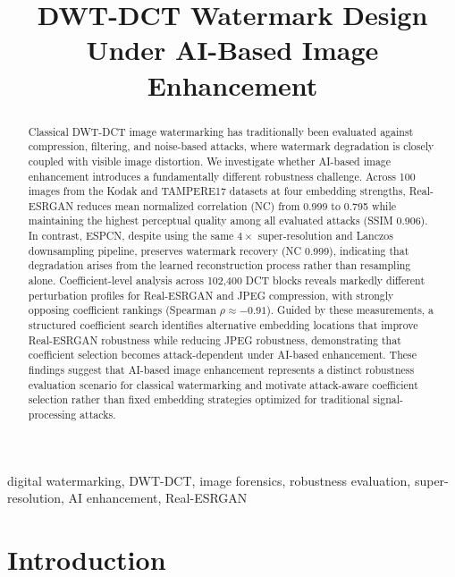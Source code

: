 \documentclass[conference]{IEEEtran}
\begin{document}
\title{DWT-DCT Watermark Design Under AI-Based Image Enhancement}

\author{
} %

\maketitle

\begin{abstract}
Classical DWT-DCT image watermarking has traditionally been evaluated
against compression, filtering, and noise-based attacks, where
watermark degradation is closely coupled with visible image distortion.
We investigate whether AI-based image enhancement introduces a
fundamentally different robustness challenge. Across 100 images from
the Kodak and TAMPERE17 datasets at four embedding strengths,
Real-ESRGAN reduces mean normalized correlation (NC) from 0.999 to
0.795 while maintaining the highest perceptual quality among all
evaluated attacks (SSIM 0.906). In contrast, ESPCN, despite using the
same $4\times$ super-resolution and Lanczos downsampling pipeline,
preserves watermark recovery (NC 0.999), indicating that degradation
arises from the learned reconstruction process rather than resampling
alone. Coefficient-level analysis across 102,400 DCT blocks reveals
markedly different perturbation profiles for Real-ESRGAN and JPEG
compression, with strongly opposing coefficient rankings (Spearman
$\rho \approx -0.91$). Guided by these measurements, a structured
coefficient search identifies alternative embedding locations that
improve Real-ESRGAN robustness while reducing JPEG robustness,
demonstrating that coefficient selection becomes attack-dependent under
AI-based enhancement. These findings suggest that AI-based image
enhancement represents a distinct robustness evaluation scenario for
classical watermarking and motivate attack-aware coefficient selection
rather than fixed embedding strategies optimized for traditional
signal-processing attacks.
\end{abstract}

\begin{IEEEkeywords}
digital watermarking, DWT-DCT, image forensics, robustness evaluation,
super-resolution, AI enhancement, Real-ESRGAN
\end{IEEEkeywords}

\section{Introduction}
\label{sec:intro}
\end{document}
